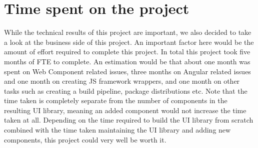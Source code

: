\section{Time spent on the project}\label{sec:results:time-spent}
While the technical results of this project are important, we also decided to take a look at the business side of this project. An important factor here would be the amount of effort required to complete this project. In total this project took five months of FTE to complete. An estimation would be that about one month was spent on Web Component related issues, three months on Angular related issues and one month on creating JS framework wrappers, and one month on other tasks such as creating a build pipeline, package distributions etc. Note that the time taken is completely separate from the number of components in the resulting UI library, meaning an added component would not increase the time taken at all. Depending on the time required to build the UI library from scratch combined with the time taken maintaining the UI library and adding new components, this project could very well be worth it.